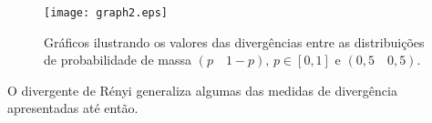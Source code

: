 \begin{comment}
$D_{PF}(p,q) = \sqrt{\sum\limits_{i=1}^{n}{(p_i-q_i)}^2}$
\end{comment}


\begin{figure}[h!]
  \caption{\label{fig:graph2} Gráficos ilustrando os valores das divergências entre as distribuições de probabilidade de massa $(p\quad1-p)\text{, } p \in [0,1]$ e $(0,5\quad0,5)$.}
  \centering
  \texttt{[image: graph2.eps]}
\end{figure}

O divergente de Rényi generaliza algumas das medidas de divergência apresentadas até então.





